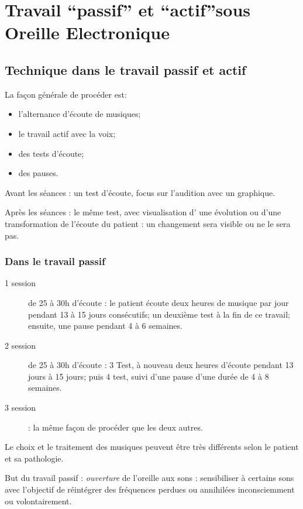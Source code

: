 \section{Travail ``passif'' et ``actif''sous Oreille Electronique}

\subsection{Technique dans le travail passif et actif}

La façon générale de procéder est:
\begin{itemize}
\item  l'alternance d'écoute de musiques;
\item le travail actif avec la voix;
\item des tests d'écoute;
\item des pauses.
\end{itemize}

Avant les séances : un test d'écoute, focus sur l'audition avec un
graphique.

Après les séances : le même test, avec visualisation d' une évolution
ou d'une transformation de l'écoute du patient : un changement sera
visible ou ne le sera pas.

\subsubsection{Dans le travail passif}

\begin{description}
\item [{1 session}] de 25 à 30h d'écoute : le patient écoute
deux heures de musique par jour pendant 13 à 15 jours consécutifs;
un deuxième test à la fin de ce travail; ensuite, une pause pendant
4 à 6 semaines.
\item [{2 session}] de 25 à 30h d'écoute : 3 Test, à nouveau
deux heures d'écoute pendant 13 jours à 15 jours; puis 4 test,
suivi d'une pause d'une durée de 4 à 8 semaines.
\item [{3 session}] : la même façon de procéder que les deux
autres. 
\end{description}
Le choix et le traitement des musiques peuvent être très différents
selon le patient et sa pathologie.

But du travail passif : \emph{ouverture} de l'oreille
aux sons : sensibiliser à certains sons avec l'objectif de réintégrer
des fréquences perdues ou annihilées inconsciemment ou volontairement. 

